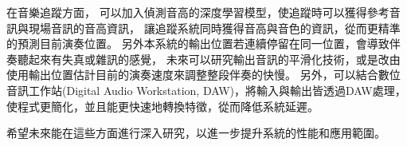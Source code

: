 \documentclass[class=NCU_thesis, crop=false]{standalone}
\begin{document}
在音樂追蹤方面，
可以加入偵測音高的深度學習模型，使追蹤時可以獲得參考音訊與現場音訊的音高資訊，
讓追蹤系統同時獲得音高與音色的資訊，從而更精準的預測目前演奏位置。
另外本系統的輸出位置若連續停留在同一位置，會導致伴奏聽起來有失真或雜訊的感覺，
未來可以研究輸出音訊的平滑化技術，或是改由使用輸出位置估計目前的演奏速度來調整整段伴奏的快慢。
另外，可以結合數位音訊工作站(Digital Audio Workstation, DAW)，將輸入與輸出皆透過DAW處理，
使程式更簡化，並且能更快速地轉換特徵，從而降低系統延遲。

希望未來能在這些方面進行深入研究，以進一步提升系統的性能和應用範圍。


\end{document}
